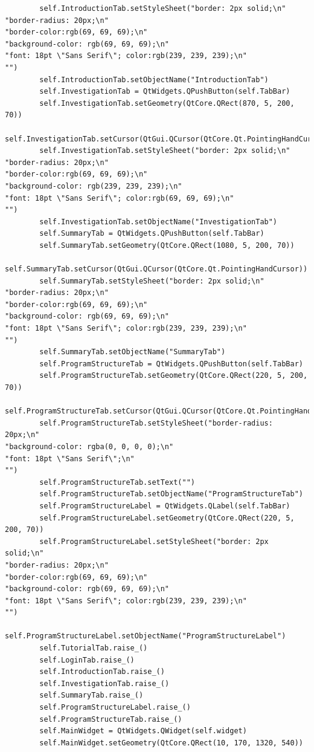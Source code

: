 \documentclass[12pt]{article}
\begin{document}
\begin{lstlisting}
        self.IntroductionTab.setStyleSheet("border: 2px solid;\n"
"border-radius: 20px;\n"
"border-color:rgb(69, 69, 69);\n"
"background-color: rgb(69, 69, 69);\n"
"font: 18pt \"Sans Serif\"; color:rgb(239, 239, 239);\n"
"")
        self.IntroductionTab.setObjectName("IntroductionTab")
        self.InvestigationTab = QtWidgets.QPushButton(self.TabBar)
        self.InvestigationTab.setGeometry(QtCore.QRect(870, 5, 200, 70))
        self.InvestigationTab.setCursor(QtGui.QCursor(QtCore.Qt.PointingHandCursor))
        self.InvestigationTab.setStyleSheet("border: 2px solid;\n"
"border-radius: 20px;\n"
"border-color:rgb(69, 69, 69);\n"
"background-color: rgb(239, 239, 239);\n"
"font: 18pt \"Sans Serif\"; color:rgb(69, 69, 69);\n"
"")
        self.InvestigationTab.setObjectName("InvestigationTab")
        self.SummaryTab = QtWidgets.QPushButton(self.TabBar)
        self.SummaryTab.setGeometry(QtCore.QRect(1080, 5, 200, 70))
        self.SummaryTab.setCursor(QtGui.QCursor(QtCore.Qt.PointingHandCursor))
        self.SummaryTab.setStyleSheet("border: 2px solid;\n"
"border-radius: 20px;\n"
"border-color:rgb(69, 69, 69);\n"
"background-color: rgb(69, 69, 69);\n"
"font: 18pt \"Sans Serif\"; color:rgb(239, 239, 239);\n"
"")
        self.SummaryTab.setObjectName("SummaryTab")
        self.ProgramStructureTab = QtWidgets.QPushButton(self.TabBar)
        self.ProgramStructureTab.setGeometry(QtCore.QRect(220, 5, 200, 70))
        self.ProgramStructureTab.setCursor(QtGui.QCursor(QtCore.Qt.PointingHandCursor))
        self.ProgramStructureTab.setStyleSheet("border-radius: 20px;\n"
"background-color: rgba(0, 0, 0, 0);\n"
"font: 18pt \"Sans Serif\";\n"
"")
        self.ProgramStructureTab.setText("")
        self.ProgramStructureTab.setObjectName("ProgramStructureTab")
        self.ProgramStructureLabel = QtWidgets.QLabel(self.TabBar)
        self.ProgramStructureLabel.setGeometry(QtCore.QRect(220, 5, 200, 70))
        self.ProgramStructureLabel.setStyleSheet("border: 2px solid;\n"
"border-radius: 20px;\n"
"border-color:rgb(69, 69, 69);\n"
"background-color: rgb(69, 69, 69);\n"
"font: 18pt \"Sans Serif\"; color:rgb(239, 239, 239);\n"
"")
        self.ProgramStructureLabel.setObjectName("ProgramStructureLabel")
        self.TutorialTab.raise_()
        self.LoginTab.raise_()
        self.IntroductionTab.raise_()
        self.InvestigationTab.raise_()
        self.SummaryTab.raise_()
        self.ProgramStructureLabel.raise_()
        self.ProgramStructureTab.raise_()
        self.MainWidget = QtWidgets.QWidget(self.widget)
        self.MainWidget.setGeometry(QtCore.QRect(10, 170, 1320, 540))

\end{lstlisting}
\end{document}

